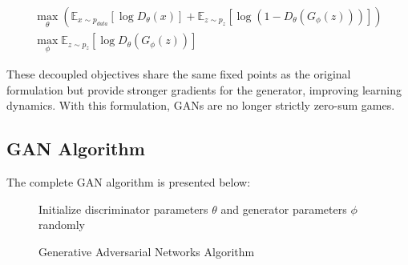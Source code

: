 \begin{align}
  \label{eq:second-value-function}
  \max_{\theta} \left( \mathbb{E}_{x \sim p_{data}}[\log D_\theta(x)] + \mathbb{E}_{z \sim p_z}[\log(1 - D_\theta(G_\phi(z)))] \right) \\
  \max_{\phi} \mathbb{E}_{z \sim p_z}[\log D_\theta(G_\phi(z))]
\end{align}

These decoupled objectives share the same fixed points as the original formulation but provide stronger gradients for the generator, improving learning dynamics. With this formulation, GANs are no longer strictly zero-sum games.

\subsection{GAN Algorithm}

The complete GAN algorithm is presented below:

\begin{figure}[H] \centering
  \begin{minipage}{0.95\linewidth}
    \begin{algorithm}[H]
      \SetAlgoLined
      Initialize discriminator parameters $\theta$ and generator parameters $\phi$ randomly\;
      \caption{Generative Adversarial Networks Algorithm}
      \label{algo:main-algo}
    \end{algorithm}
  \end{minipage}
\end{figure}

